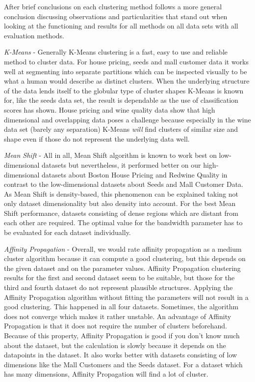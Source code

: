 
After brief conclusions on each clustering method follows a more general conclusion discussing observations and particularities that stand out when looking at the functioning and results for all methods on all data sets with all evaluation methods.

\textit{K-Means} - Generally K-Means clustering is a fast, easy to use and reliable method to cluster data. For house pricing, seeds and mall customer data it works well at segmenting into separate partitions which can be inspected visually to be what a human would describe as distinct clusters. When the underlying structure of the data lends itself to the globular type of cluster shapes K-Means is known for, like the seeds data set, the result is dependable as the use of classification scores has shown. House pricing and wine quality data show that high dimensional and overlapping data poses a challenge because especially in the wine data set (barely any separation) K-Means \textit{will} find clusters of similar size and shape even if those do not represent the underlying data well.

\textit{Mean Shift} - All in all, Mean Shift algorithm is known to work best on low-dimensional datasets but nevertheless, it performed better on our high-dimensional datasets about Boston House Pricing and Redwine Quality in contrast to the low-dimensional datasets about Seeds and Mall Customer Data. As Mean Shift is density-based, this phenomenon can be explained taking not only dataset dimensionality but also density into account. For the best Mean Shift performance, datasets consisting of dense regions which are distant from each other are required.
The optimal value for the bandwidth parameter has to be evaluated for each dataset individually.

\textit{Affinity Propagation} - Overall, we would rate affinity propagation as a medium cluster algorithm because it can compute a good clustering, but this depends on the given dataset and on the parameter values. Affinity Propagation clustering results for the first and second dataset seem to be suitable, but those for the third and fourth dataset do not represent plausible structures. Applying the Affinity Propagation algorithm without fitting the parameters will not result in a good clustering. This happened in all four datasets. Sometimes, the algorithm does not converge which makes it rather unstable. An advantage of Affinity Propagation is that it does not require the number of clusters beforehand. Because of this property, Affinity Propagation is good if you don’t know much about the dataset, but the calculation is slowly because it depends on the datapoints in the dataset. It also works better with datasets consisting of low dimensions like the Mall Customers and the Seeds dataset. For a dataset which has many dimensions, Affinity Propagation will find a lot of cluster. \\

